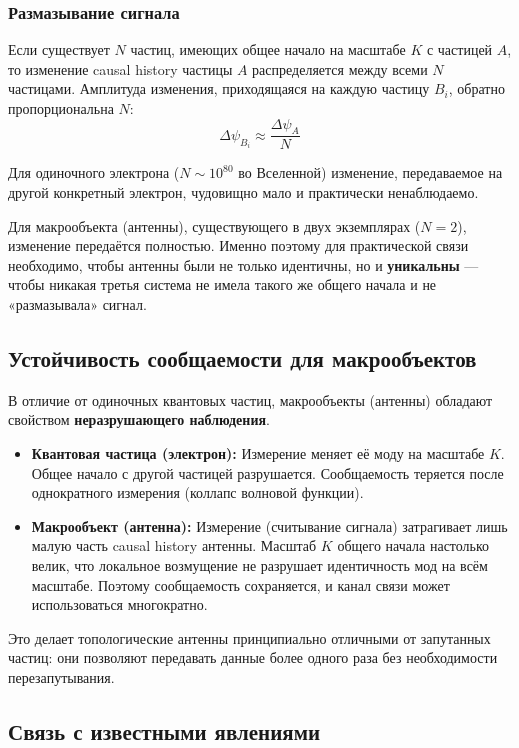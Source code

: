 \documentclass[12pt,a4paper]{article}
\begin{document}
\subsubsection{Размазывание сигнала}
Если существует $N$ частиц, имеющих общее начало на масштабе $K$ с частицей $A$, то изменение causal history частицы $A$ распределяется между всеми $N$ частицами. Амплитуда изменения, приходящаяся на каждую частицу $B_i$, обратно пропорциональна $N$:
\begin{equation}
    \Delta\psi_{B_i} \approx \frac{\Delta\psi_A}{N}
\end{equation}

Для одиночного электрона ($N \sim 10^{80}$ во Вселенной) изменение, передаваемое на другой конкретный электрон, чудовищно мало и практически ненаблюдаемо.

Для макрообъекта (антенны), существующего в двух экземплярах ($N = 2$), изменение передаётся полностью. Именно поэтому для практической связи необходимо, чтобы антенны были не только идентичны, но и \textbf{уникальны} --- чтобы никакая третья система не имела такого же общего начала и не «размазывала» сигнал.

\subsection{Устойчивость сообщаемости для макрообъектов}
В отличие от одиночных квантовых частиц, макрообъекты (антенны) обладают свойством \textbf{неразрушающего наблюдения}.

\begin{itemize}
    \item \textbf{Квантовая частица (электрон):} Измерение меняет её моду на масштабе $K$. Общее начало с другой частицей разрушается. Сообщаемость теряется после однократного измерения (коллапс волновой функции).
    \item \textbf{Макрообъект (антенна):} Измерение (считывание сигнала) затрагивает лишь малую часть causal history антенны. Масштаб $K$ общего начала настолько велик, что локальное возмущение не разрушает идентичность мод на всём масштабе. Поэтому сообщаемость сохраняется, и канал связи может использоваться многократно.
\end{itemize}

Это делает топологические антенны принципиально отличными от запутанных частиц: они позволяют передавать данные более одного раза без необходимости перезапутывания.

\subsection{Связь с известными явлениями}
\end{document}
